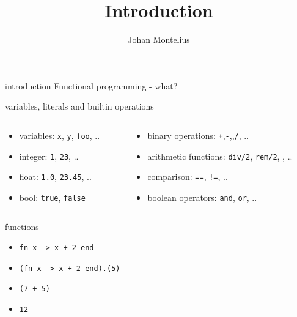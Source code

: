 


\title[ID1019 Introduction]{Introduction}

\author{Johan Montelius}
\date{\semester}



\begin{frame}
\titlepage
\end{frame}

\begin{frame}{introduction}
  Functional programming - what?
\end{frame}

\begin{frame}{variables, literals and builtin operations}
\begin{columns}
 \begin{column}{0.4\linewidth}
   \begin{itemize}
     \pause \item {variables:} {\tt x}, {\tt y}, {\tt foo}, ..
     \pause \item {integer:} {\tt 1}, {\tt 23}, ..
     \pause \item {float:} {\tt 1.0}, {\tt 23.45}, ..
     \pause \item {bool:} {\tt true}, {\tt false} 
   \end{itemize}
 \end{column}
 \begin{column}{0.6\linewidth}
  \begin{itemize}
    \pause \item {binary operations:} {\tt +},{\tt -},{\tt *},{\tt /}, ..
    \pause \item {arithmetic functions:} {\tt div/2}, {\tt rem/2}, {\tt *}, ..   
    \pause \item {comparison:} {\tt ==}, {\tt !=}, ..
    \pause \item {boolean operators:} {\tt and}, {\tt or}, ..
  \end{itemize}
 \end{column}
\end{columns}

\vspace{20pt}{\em There are more but this is fine for now.}

\end{frame}


\begin{frame}{functions}
  \begin{itemize}
   \pause \item {\tt fn x -> x + 2 end}
   \pause \item {\tt (fn x -> x + 2 end).(5)}
   \pause \item {\tt (7 + 5)}
   \pause \item {\tt 12}
  \end{itemize}


\vspace{20pt}{\em Can we give names to functions?}  
\end{frame}

